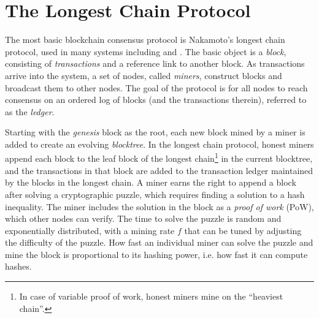 \chapter{The Longest Chain Protocol}
\label{sec:background}





The most basic blockchain consensus protocol is Nakamoto's longest chain protocol, used in many systems including \bitcoin and \ethereum.  The basic object is a {\em block}, consisting of {\em transactions} and a reference link to another block. 
As transactions arrive into the system, a set of nodes, called {\em miners}, construct blocks and broadcast them to other nodes. The goal of the protocol is for all nodes to reach consensus on an ordered log of blocks (and the transactions therein), referred to as the {\em ledger}.

Starting with the {\em genesis} block as the root, each new block mined by a miner is added to create an evolving {\em blocktree}. In the longest chain protocol, honest miners append each block to the leaf block of the longest chain\footnote{In case of variable proof of work, honest miners mine on the ``heaviest chain''.} in the current blocktree, and the transactions in that block are added to the transaction ledger maintained by the blocks in the longest chain. 
A miner earns the right to append a block after solving a cryptographic puzzle, which requires finding a solution to a hash inequality.
 The miner includes the solution in the block as a {\em proof of work} (PoW), which other nodes can verify.  The time to solve the puzzle is random and exponentially distributed, with a mining rate $f$ that can be tuned by adjusting the difficulty of the puzzle. How fast an individual miner can solve the puzzle and mine the block is proportional to its hashing power, i.e. how fast it can compute hashes. 
 
